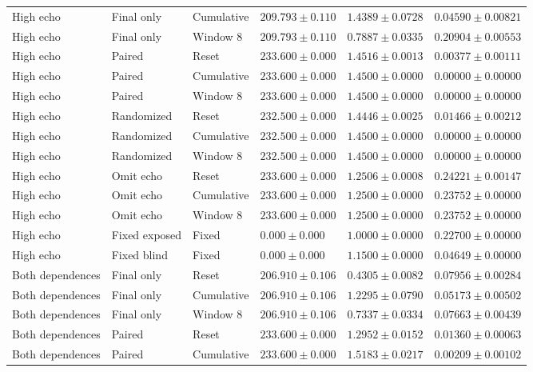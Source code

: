 \begin{longtable}{@{}llllll@{}}
High echo & Final only & Cumulative & $209.793 \pm 0.110$ & $1.4389 \pm 0.0728$ & $0.04590 \pm 0.00821$ \\
High echo & Final only & Window 8 & $209.793 \pm 0.110$ & $0.7887 \pm 0.0335$ & $0.20904 \pm 0.00553$ \\
High echo & Paired & Reset & $233.600 \pm 0.000$ & $1.4516 \pm 0.0013$ & $0.00377 \pm 0.00111$ \\
High echo & Paired & Cumulative & $233.600 \pm 0.000$ & $1.4500 \pm 0.0000$ & $0.00000 \pm 0.00000$ \\
High echo & Paired & Window 8 & $233.600 \pm 0.000$ & $1.4500 \pm 0.0000$ & $0.00000 \pm 0.00000$ \\
High echo & Randomized & Reset & $232.500 \pm 0.000$ & $1.4446 \pm 0.0025$ & $0.01466 \pm 0.00212$ \\
High echo & Randomized & Cumulative & $232.500 \pm 0.000$ & $1.4500 \pm 0.0000$ & $0.00000 \pm 0.00000$ \\
High echo & Randomized & Window 8 & $232.500 \pm 0.000$ & $1.4500 \pm 0.0000$ & $0.00000 \pm 0.00000$ \\
High echo & Omit echo & Reset & $233.600 \pm 0.000$ & $1.2506 \pm 0.0008$ & $0.24221 \pm 0.00147$ \\
High echo & Omit echo & Cumulative & $233.600 \pm 0.000$ & $1.2500 \pm 0.0000$ & $0.23752 \pm 0.00000$ \\
High echo & Omit echo & Window 8 & $233.600 \pm 0.000$ & $1.2500 \pm 0.0000$ & $0.23752 \pm 0.00000$ \\
High echo & Fixed exposed & Fixed & $0.000 \pm 0.000$ & $1.0000 \pm 0.0000$ & $0.22700 \pm 0.00000$ \\
High echo & Fixed blind & Fixed & $0.000 \pm 0.000$ & $1.1500 \pm 0.0000$ & $0.04649 \pm 0.00000$ \\
Both dependences & Final only & Reset & $206.910 \pm 0.106$ & $0.4305 \pm 0.0082$ & $0.07956 \pm 0.00284$ \\
Both dependences & Final only & Cumulative & $206.910 \pm 0.106$ & $1.2295 \pm 0.0790$ & $0.05173 \pm 0.00502$ \\
Both dependences & Final only & Window 8 & $206.910 \pm 0.106$ & $0.7337 \pm 0.0334$ & $0.07663 \pm 0.00439$ \\
Both dependences & Paired & Reset & $233.600 \pm 0.000$ & $1.2952 \pm 0.0152$ & $0.01360 \pm 0.00063$ \\
Both dependences & Paired & Cumulative & $233.600 \pm 0.000$ & $1.5183 \pm 0.0217$ & $0.00209 \pm 0.00102$ \\

\end{longtable}
